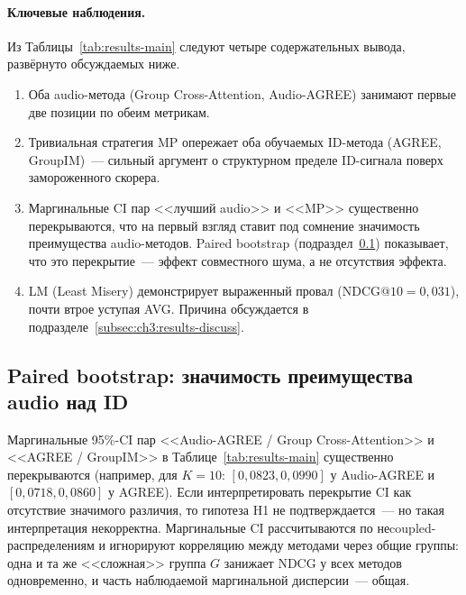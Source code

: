 \begin{table}[ht]
    \centering
    \caption{Сравнение групповых агрегаторов на тесте (2{,}000 случайных групп, размер 2--5, $N_{\mathrm{boot}} = 1{,}000$). Жирным выделены два лучших метода. Audio-методы превосходят все остальные на обоих $K$.}
    \label{tab:results-main}
    
\end{table}

\paragraph{Ключевые наблюдения.} Из Таблицы~\ref{tab:results-main} следуют четыре содержательных вывода, развёрнуто обсуждаемых ниже.
\begin{enumerate}
    \item Оба audio-метода (Group Cross-Attention, Audio-AGREE) занимают первые две позиции по обеим метрикам.
    \item Тривиальная стратегия MP опережает оба обучаемых ID-метода (AGREE, GroupIM)~--- сильный аргумент о структурном пределе ID-сигнала поверх замороженного скорера.
    \item Маргинальные CI пар <<лучший audio>> и <<MP>> существенно перекрываются, что на первый взгляд ставит под сомнение значимость преимущества audio-методов. Paired bootstrap (подраздел~\ref{subsec:ch3:paired}) показывает, что это перекрытие~--- эффект совместного шума, а не отсутствия эффекта.
    \item LM (Least Misery) демонстрирует выраженный провал ($\mathrm{NDCG@10} = 0{,}031$), почти втрое уступая AVG. Причина обсуждается в подразделе~\ref{subsec:ch3:results-discuss}.
\end{enumerate}

\subsection{Paired bootstrap: значимость преимущества audio над ID}\label{subsec:ch3:paired}

Маргинальные 95\%-CI пар <<Audio-AGREE / Group Cross-Attention>> и <<AGREE / GroupIM>> в Таблице~\ref{tab:results-main} существенно перекрываются (например, для $K = 10$: $[0{,}0823, 0{,}0990]$ у Audio-AGREE и $[0{,}0718, 0{,}0860]$ у AGREE). Если интерпретировать перекрытие CI как отсутствие значимого различия, то гипотеза H1 не подтверждается~--- но такая интерпретация некорректна. Маргинальные CI рассчитываются по неcoupled-распределениям и игнорируют корреляцию между методами через общие группы: одна и та же <<сложная>> группа $G$ занижает NDCG у всех методов одновременно, и часть наблюдаемой маргинальной дисперсии~--- общая.

